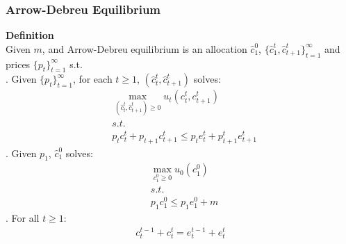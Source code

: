 \documentclass{article}
\begin{document}
\subsubsection{Arrow-Debreu Equilibrium}
\textbf{Definition}\\
Given $m$, and Arrow-Debreu equilibrium is an allocation $\hat{c}^0_1$, $\{\hat{c}^t_1, \hat{c}^t_{t+1}\}^\infty_{t=1}$ and prices $\{p_t\}^\infty_{t=1}$ s.t.\\
. Given $\{p_t\}^\infty_{t=1}$, for each $t \geq 1$, $(\hat{c}^t_t, \hat{c}^t_{t+1})$ solves:
	\begin{align*}
		&\mathop{max}\limits_{(\hat{c}^t_t, \hat{c}^t_{t+1}) \geq 0} u_t(c^t_t, c^t_{t+1})\\
		&s.t.\\
		&p_t c^t_t + p_{t+1}c^t_{t+1} \leq p_t e^t_t + p^t_{t+1} e^t_{t+1}
	\end{align*} 
. Given $p_1$, $\hat{c}^0_1$ solves:
	\begin{align*}
		&\mathop{max}\limits_{c^0_1 \geq 0} u_0(c^0_1)\\
		&s.t.\\
		&p_1 c^0_1 \leq p_1 e^0_1 + m
	\end{align*}
. For all $t \geq 1$:
	\begin{align*}
		c^{t-1}_t + c^t_t = e^{t-1}_t + e^t_t
	\end{align*}
\end{document}
